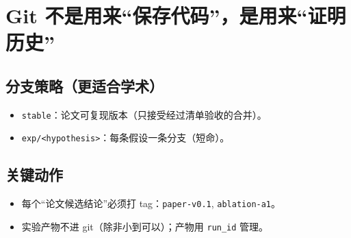 \chapter{Git 不是用来“保存代码”，是用来“证明历史”}
\label{ch:git_proof}
\section{分支策略（更适合学术）}
\begin{itemize}
  \item \texttt{stable}：论文可复现版本（只接受经过清单验收的合并）。
  \item \texttt{exp/<hypothesis>}：每条假设一条分支（短命）。
\end{itemize}

\section{关键动作}
\begin{itemize}
  \item 每个“论文候选结论”必须打 tag：\texttt{paper-v0.1}, \texttt{ablation-a1}。
  \item 实验产物不进 git（除非小到可以）；产物用 \texttt{run\_id} 管理。
\end{itemize}